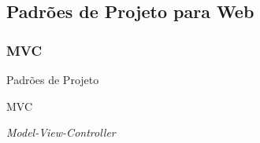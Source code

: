 \documentclass[
	10pt, %
	t, %
]{beamer}
\begin{document}

\subsection{Padrões de Projeto para Web}
\subsubsection{MVC}

\begin{frame}
	\begin{center}
		
		\bigskip\bigskip\bigskip\bigskip %
		{\Large Padrões de Projeto}
		
		\bigskip\bigskip %
		{\Huge MVC}
		
		\smallskip
		{\small \textit{Model-View-Controller}}
	\end{center}

\end{frame}
\end{document}
